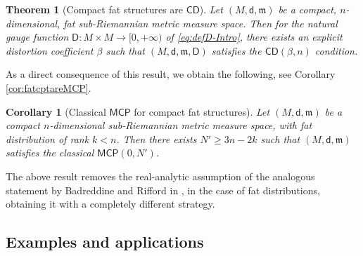 \documentclass[11pt,a4paper]{article}
\theoremstyle{plain}
\newtheorem*{theorem*}{Theorem}
\newtheorem*{corollary*}{Corollary}
\theoremstyle{definition}
\theoremstyle{remark}
\numberwithin{equation}{section}
\newcommand{\CD}{\mathsf{CD}}
\newcommand{\MCP}{\mathsf{MCP}}
\newcommand{\mm}{\mathfrak m}
\newcommand{\sfd}{\mathsf d}
\newcommand{\sfD}{\mathsf D}
\begin{document}
\begin{theorem*}[Compact fat structures are $\CD$]
Let $(M,\sfd,\mm)$ be a compact, $n$-dimensional, fat sub-Riemannian metric measure space. Then for the natural gauge function $\sfD: M\times M \to [0,+\infty)$ of \eqref{eq:defD-Intro}, there exists an explicit distortion coefficient $\beta$ such that $(M,\sfd,\mm,\sfD)$ satisfies the $\CD(\beta, n)$ condition.
\end{theorem*}

As a direct consequence of this result, we obtain the following, see Corollary \ref{cor:fatcptareMCP}.

\begin{corollary*}[Classical $\MCP$ for compact fat structures]
Let $(M,\sfd,\mm)$ be a compact $n$-dimensional sub-Riemannian metric measure space, with fat distribution of rank $k<n$. Then there exists $N'\geq 3n-2k$ such that $(M,\sfd,\mm)$ satisfies the classical $\MCP(0,N')$.
\end{corollary*}

The above result removes the real-analytic assumption of the analogous statement by Badreddine and Rifford in \cite[Thm.\@ 1.3]{BR-realanalMCP}, in the case of fat distributions, obtaining it with a completely different strategy.


\subsection*{Examples and applications}
\end{document}
